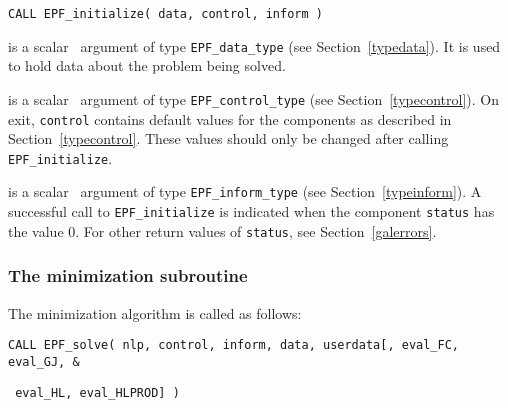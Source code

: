 \documentclass{galahad}
\newcommand{\packagename}{EPF}
\begin{document}
\hspace{8mm}
{\tt CALL \packagename\_initialize( data, control, inform )}

\vspace*{-2mm}
\begin{description}

 is a scalar \intentinout\ argument of type
{\tt \packagename\_data\_type}
(see Section~\ref{typedata}). It is used to hold data about the problem being
solved.

 is a scalar \intentout\ argument of type
{\tt \packagename\_control\_type}
(see Section~\ref{typecontrol}).
On exit, {\tt control} contains default values for the components as
described in Section~\ref{typecontrol}.
These values should only be changed after calling
{\tt \packagename\_initialize}.

 is a scalar \intentout\ argument of type
{\tt \packagename\_inform\_type}
(see Section~\ref{typeinform}). A successful call to
{\tt \packagename\_initialize}
is indicated when the  component {\tt status} has the value 0.
For other return values of {\tt status}, see Section~\ref{galerrors}.

\end{description}


\subsubsection{The minimization subroutine}
The minimization algorithm is called as follows:
\vspace*{1mm}

\hspace{8mm}
{\tt CALL \packagename\_solve( nlp, control, inform, data, userdata[, eval\_FC,
eval\_GJ, \hspace{8mm}                  \&}
\vspace*{-1mm}

\hspace{37mm}
{\tt
eval\_HL,  eval\_HLPROD] )}
\end{document}
